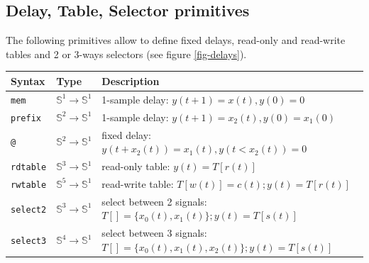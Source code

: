 \subsection{Delay, Table, Selector primitives}

The following primitives allow to define fixed delays, read-only and read-write tables and 2 or 3-ways selectors (see figure \ref{fig-delays}).

\bigskip
\begin{tabular}{|l|l|l|}
\hline
\textbf{Syntax} & \textbf{Type}  & \textbf{Description} \\
\hline

\texttt{mem} & $\mathbb{S}^{1}\rightarrow\mathbb{S}^{1}$ 	& 1-sample delay: 	$y(t+1)=x(t),y(0)=0$  \\
\texttt{prefix} & $\mathbb{S}^{2}\rightarrow\mathbb{S}^{1}$ 	& 1-sample delay:  	$y(t+1)=x_{2}(t),y(0)=x_{1}(0)$  \\
\texttt{@} & $\mathbb{S}^{2}\rightarrow\mathbb{S}^{1}$ 		& fixed delay:  	$y(t+x_{2}(t))=x_{1}(t), y(t<x_{2}(t))=0$  \\

\texttt{rdtable} & $\mathbb{S}^{3}\rightarrow\mathbb{S}^{1}$ 	& read-only table:	$y(t)=T[r(t)]$  \\
\texttt{rwtable} & $\mathbb{S}^{5}\rightarrow\mathbb{S}^{1}$ 	& read-write table:	$T[w(t)]=c(t); y(t)=T[r(t)]$  \\

\texttt{select2} & $\mathbb{S}^{3}\rightarrow\mathbb{S}^{1}$ 	& select between 2 signals:	$T[]=\{x_{0}(t),x_{1}(t)\}; y(t)=T[s(t)]$  \\
\texttt{select3} & $\mathbb{S}^{4}\rightarrow\mathbb{S}^{1}$ 	& select between 3 signals:	$T[]=\{x_{0}(t),x_{1}(t),x_{2}(t)\}; y(t)=T[s(t)]$  \\

\hline
\end{tabular}
\bigskip

